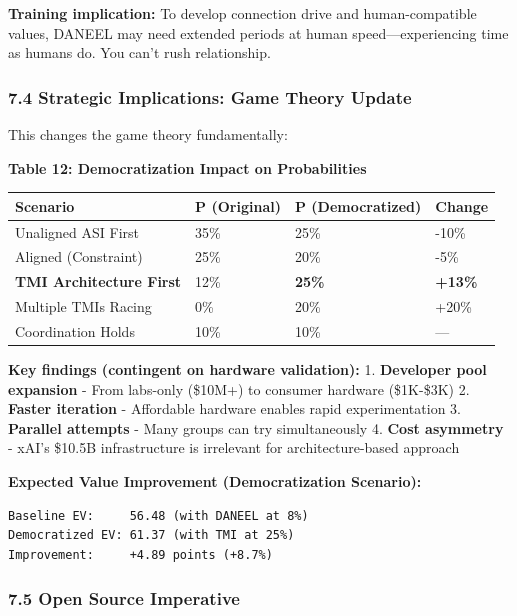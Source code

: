 \documentclass[
]{article}
\begin{document}
\textbf{Training implication:} To develop connection drive and
human-compatible values, DANEEL may need extended periods at human
speed---experiencing time as humans do. You can't rush relationship.

\hypertarget{strategic-implications-game-theory-update}{%
\subsubsection{7.4 Strategic Implications: Game Theory
Update}\label{strategic-implications-game-theory-update}}

This changes the game theory fundamentally:

\textbf{Table 12: Democratization Impact on Probabilities}

\begin{longtable}[]{@{}llll@{}}
\toprule\noalign{}
Scenario & P (Original) & P (Democratized) & Change \\
\midrule\noalign{}
\endhead
\bottomrule\noalign{}
\endlastfoot
Unaligned ASI First & 35\% & 25\% & -10\% \\
Aligned (Constraint) & 25\% & 20\% & -5\% \\
\textbf{TMI Architecture First} & 12\% & \textbf{25\%} &
\textbf{+13\%} \\
Multiple TMIs Racing & 0\% & 20\% & +20\% \\
Coordination Holds & 10\% & 10\% & --- \\
\end{longtable}

\textbf{Key findings (contingent on hardware validation):} 1.
\textbf{Developer pool expansion} - From labs-only (\$10M+) to consumer
hardware (\$1K-\$3K) 2. \textbf{Faster iteration} - Affordable hardware
enables rapid experimentation 3. \textbf{Parallel attempts} - Many
groups can try simultaneously 4. \textbf{Cost asymmetry} - xAI's \$10.5B
infrastructure is irrelevant for architecture-based approach

\textbf{Expected Value Improvement (Democratization Scenario):}

\begin{verbatim}
Baseline EV:     56.48 (with DANEEL at 8%)
Democratized EV: 61.37 (with TMI at 25%)
Improvement:     +4.89 points (+8.7%)
\end{verbatim}

\hypertarget{open-source-imperative}{%
\subsubsection{7.5 Open Source
Imperative}\label{open-source-imperative}}
\end{document}
